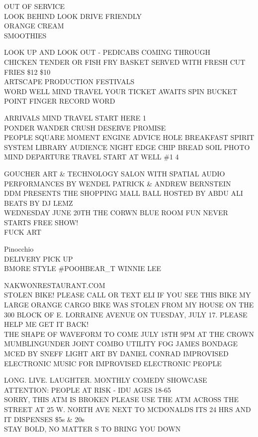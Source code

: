 \documentclass[10pt,letterpaper]{article}
\begin{document}
OUT OF SERVICE\\
LOOK BEHIND LOOK DRIVE FRIENDLY\\
ORANGE CREAM\\
SMOOTHIES

LOOK UP AND LOOK OUT {-} PEDICABS COMING THROUGH\\
CHICKEN TENDER OR FISH FRY BASKET SERVED WITH FRESH CUT FRIES \$12 \$10\\
ARTSCAPE PRODUCTION FESTIVALS\\
WORD WELL MIND TRAVEL YOUR TICKET AWAITS SPIN BUCKET POINT FINGER RECORD WORD

ARRIVALS MIND TRAVEL START HERE 1\\
PONDER WANDER CRUSH DESERVE PROMISE\\
PEOPLE SQUARE MOMENT ENGINE ADVICE HOLE BREAKFAST SPIRIT SYSTEM LIBRARY AUDIENCE NIGHT EDGE CHIP BREAD SOIL PHOTO\\
MIND DEPARTURE TRAVEL START AT WELL \#1 4

GOUCHER ART \& TECHNOLOGY SALON WITH SPATIAL AUDIO PERFORMANCES BY WENDEL PATRICK \& ANDREW BERNSTEIN\\
DDM PRESENTS THE SHOPPING MALL BALL HOSTED BY ABDU ALI BEATS BY DJ LEMZ\\
WEDNESDAY JUNE 20TH THE CORWN BLUE ROOM FUN NEVER STARTS FREE SHOW!\\
FUCK ART

Pinocchio\\
DELIVERY PICK UP\\
BMORE STYLE \#POOHBEAR\_T WINNIE LEE

NAKWONRESTAURANT.COM\\
STOLEN BIKE!  PLEASE CALL OR TEXT ELI IF YOU SEE THIS BIKE MY LARGE ORANGE CARGO BIKE WAS STOLEN FROM MY HOUSE ON THE 300 BLOCK OF E. LORRAINE AVENUE ON TUESDAY, JULY 17.  PLEASE HELP ME GET IT BACK!\\
THE SHAPE OF WAVEFORM TO COME JULY 18TH 9PM AT THE CROWN MUMBLINGUNDER JOINT COMBO UTILITY FOG JAMES BONDAGE MCED BY SNEFF LIGHT ART BY DANIEL CONRAD IMPROVISED ELECTRONIC MUSIC FOR IMPROVISED ELECTRONIC PEOPLE

LONG. LIVE. LAUGHTER.  MONTHLY COMEDY SHOWCASE\\
ATTENTION: PEOPLE AT RISK {-} IDU AGES 18{-}65\\
SORRY, THIS ATM IS BROKEN PLEASE USE THE ATM ACROSS THE STREET AT 25 W. NORTH AVE NEXT TO MCDONALDS ITS 24 HRS AND IT DISPENSES \$5s \& 20s\\
STAY BOLD, NO MATTER S TO BRING YOU DOWN
\end{document}
